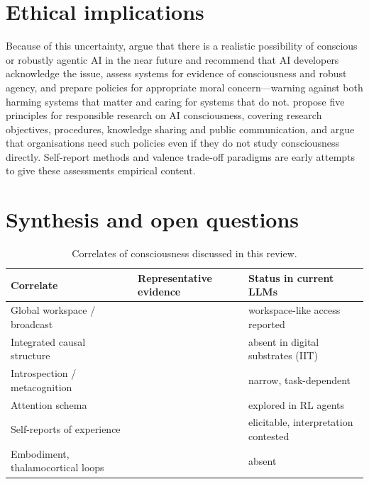\documentclass[11pt,a4paper]{article}
\begin{document}
\section{Ethical implications}
\label{sec:ethics}

Because of this uncertainty, \citet{long2024taking} argue that there is a
realistic possibility of conscious or robustly agentic AI in the near future and
recommend that AI developers acknowledge the issue, assess systems for evidence
of consciousness and robust agency, and prepare policies for appropriate moral
concern---warning against both harming systems that matter and caring for
systems that do not. \citet{butlin2025principles} propose five principles for
responsible research on AI consciousness, covering research objectives,
procedures, knowledge sharing and public communication, and argue that
organisations need such policies even if they do not study consciousness
directly. Self-report methods \citep{perez2023evaluating} and valence
trade-off paradigms \citep{keeling2024llms} are early attempts to give these
assessments empirical content.

\section{Synthesis and open questions}
\label{sec:synthesis}

\begin{table}[h]
\centering
\small
\begin{tabularx}{\linewidth}{@{}lXl@{}}
\toprule
Correlate & Representative evidence & Status in current LLMs \\
\midrule
Global workspace / broadcast & \citet{goyal2021coordination,devillers2023semi,gurnee2026verbalizable} & workspace-like access reported \\
Integrated causal structure & \citet{albantakis2022integrated,findlay2024dissociating} & absent in digital substrates (IIT) \\
Introspection / metacognition & \citet{binder2024looking,song2025language,jian2025language} & narrow, task-dependent \\
Attention schema & \citet{liu2023attention} & explored in RL agents \\
Self-reports of experience & \citet{perez2023evaluating,berg2025large} & elicitable, interpretation contested \\
Embodiment, thalamocortical loops & \citet{aru2023feasibility,farisco2024artificial} & absent \\
\bottomrule
\end{tabularx}
\caption{Correlates of consciousness discussed in this review.}
\end{table}
\end{document}
